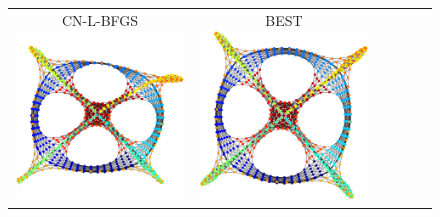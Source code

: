 \documentclass[dvipdfmx,10pt,journal,compsoc]{IEEEtran}
\begin{document}
\begin{figure}[btp]
\begin{tabular}{cccccc}
    \makecell{\small{\textsf{CN-L-BFGS}}                                                                                                                 \\[-0.2em]\includegraphics[width=0.27\columnwidth]{individual/vis/dwt_1005_CN-L-BFGS.png}} &
    \makecell{\small{\textsf{BEST}}                                                                                                                      \\[-0.2em]\includegraphics[width=0.27\columnwidth]{individual/vis/opt_dwt_1005.png}} \\


\end{tabular}
\end{figure}
\end{document}
